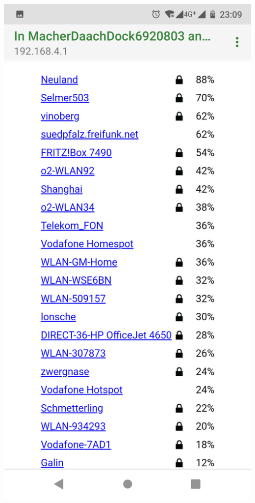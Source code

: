 \documentclass{article}
\begin{document}
\begin{minipage}[b]{0.5\textwidth}
	\includegraphics[width=\textwidth]{Bilder2019/Screenshot_20190918-230951_CaptivePortalLogin.png}
\end{minipage}
\end{document}

